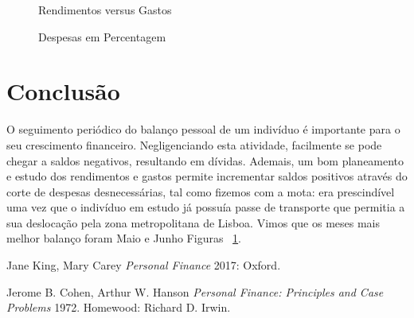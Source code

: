 \documentclass[11pt]{report}
\begin{document}
\begin{figure} [t]
    \label{figura2.1}
    \caption{Rendimentos versus Gastos}
\end{figure}


\begin{figure} [b]
\centering
{}
\caption{Despesas em Percentagem}
\end{figure}


\chapter{Conclusão}
O seguimento periódico do balanço pessoal de um indivíduo é importante para o seu crescimento financeiro. Negligenciando esta atividade, facilmente se pode chegar a saldos negativos, resultando em dívidas. Ademais, um bom planeamento e estudo dos rendimentos e gastos permite incrementar saldos positivos através do corte de despesas desnecessárias, tal como fizemos com a mota: era prescindível uma vez que o indivíduo em estudo já possuía passe de transporte que permitia a sua deslocação pela zona metropolitana de Lisboa. Vimos que os meses mais melhor balanço foram Maio e Junho  Figuras ~\ref{figura2.1}.


\begin{thebibliography}{1}

   Jane King, Mary Carey {\em Personal Finance}  2017:
  Oxford.

   Jerome B. Cohen, Arthur W. Hanson {\em Personal Finance: Principles and Case Problems} 1972. Homewood: Richard D. Irwin. 


\end{thebibliography}
\end{document}
